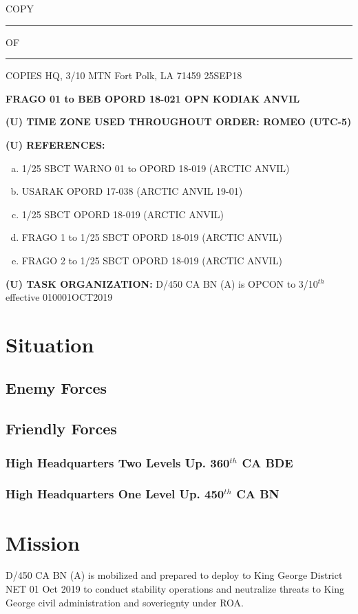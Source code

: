 \documentclass[12pt,letterpaper,notitlepage]{article}
\newcommand{\unclass}{(U)}
\newcommand{\uptwo}{360$^{th}$ CA BDE}
\newcommand{\upone}{450$^{th}$ CA BN}
\newcommand{\unit}{D/450 CA BN (A)}
\newcommand{\timezone}{ROMEO (UTC-5)}
\begin{document}
\begin{flushright}
COPY \rule{1cm}{0.4pt} OF \rule{1cm}{0.4pt} COPIES \linebreak
HQ, 3/10 MTN \linebreak
Fort Polk, LA 71459 \linebreak
25SEP18
\end{flushright}

\textbf{FRAGO 01 to BEB OPORD 18-021 OPN KODIAK ANVIL}

\textbf{\unclass{} TIME ZONE USED THROUGHOUT ORDER: \timezone}

\textbf{\unclass{} REFERENCES:}
\begin{enumerate}[(a)]
\item 1/25 SBCT WARNO 01 to OPORD 18-019 (ARCTIC ANVIL)
\item USARAK OPORD 17-038 (ARCTIC ANVIL 19-01)
\item 1/25 SBCT OPORD 18-019 (ARCTIC ANVIL)
\item FRAGO 1 to 1/25 SBCT OPORD 18-019 (ARCTIC ANVIL)
\item FRAGO 2 to 1/25 SBCT OPORD 18-019 (ARCTIC ANVIL)
\end{enumerate}

\textbf{\unclass{} TASK ORGANIZATION:}
\unit{} is OPCON to 3/10$^{th}$ effective 010001OCT2019

\section{Situation}
\subsection{Enemy Forces}
\subsection{Friendly Forces}
\subsubsection{High Headquarters Two Levels Up. \uptwo{}}
\subsubsection{High Headquarters One Level Up. \upone{}}

\section{Mission}
\unit{} is mobilized and prepared to deploy to King George District NET 01 Oct 2019
to conduct stability operations and neutralize threats to King George civil
administration and soveriegnty under ROA.
\end{document}
